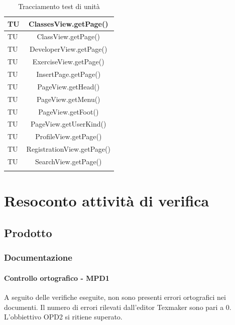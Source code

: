 \begin{longtable}{|>{\centering\arraybackslash}m{1.6cm}|c|}
		TU & ClassesView.getPage()\\ \hline
		TU & ClassView.getPage()\\ \hline
		TU & DeveloperView.getPage()\\ \hline
		TU & ExerciseView.getPage()\\ \hline
		TU & InsertPage.getPage()\\ \hline
		TU & PageView.getHead()\\ \hline
		TU & PageView.getMenu() \\ \hline
		TU & PageView.getFoot()\\ \hline
		TU & PageView.getUserKind()\\ \hline
		TU & ProfileView.getPage()\\ \hline
		TU & RegistrationView.getPage()\\ \hline
		TU & SearchView.getPage()\\ \hline
		
		\caption{Tracciamento test di unità}
\end{longtable}

	
\newpage
\section{Resoconto attività di verifica}
\subsection{Prodotto}
\subsubsection{Documentazione}
\paragraph{Controllo ortografico - MPD1\\}
A seguito delle verifiche eseguite, non sono presenti errori ortografici nei documenti. Il numero di errori rilevati dall'editor Texmaker sono pari a 0.\\
L'obbiettivo OPD2 si ritiene superato.

